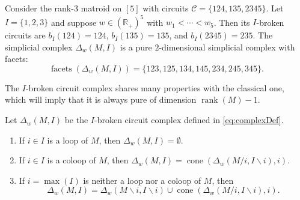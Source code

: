 \documentclass[ALCO,ThmDefs,Unicode,epreuves]{cedram}
\newcommand{\R}{\mathbb{R}}
\newcommand{\CC}{\mathcal{C}}
\DeclareMathOperator{\rank}{rank}
\DeclareMathOperator{\cone}{cone}
\DeclareMathOperator{\facets}{facets}
\begin{document}
\begin{exam} \label{ex:NonGenMatroid} 
Consider the rank-$3$ matroid on $[5]$ with circuits $\CC = \{124, 135, 2345\}$.
Let $I = \{1,2,3\}$ and suppose $w\in (\R_+)^5$ with $w_1<\cdots < w_5$.
Then its $I$-broken circuits are 
$b_I(124) = 124$, $b_I(135) = 135$, and
$b_I(2345) = 235$.
The simplicial complex $\Delta_w(M,I)$ is a pure $2$-dimensional simplicial complex with facets:
\[ \facets(\Delta_w(M,I))  =  \{ 123, 125, 134, 145, 234, 245, 345 \}.\]
\end{exam}


The $I$-broken circuit complex shares many properties with the classical one, which will imply that 
it is always pure of dimension $\rank (M)-1$. 


\begin{theo}\label{thm:Complex}
Let $\Delta_w(M,I)$ be the $I$-broken circuit complex defined in \eqref{eq:complexDef}. 
\begin{enumerate}[(\alph*)]
\item\label{theo3.2_a} %
If $i\in I$ is a loop of $M$, then $\Delta_w(M,I) = \emptyset$. 
\item\label{theo3.2_b} %
If $i\in I$ is a coloop of $M$, then $\Delta_w(M,I)=\cone (\Delta_w(M/i,I\backslash i),i)$.
\item\label{theo3.2_c} %
If $i=\max(I)$ is neither a loop nor a coloop of $M$, then 
\[\Delta_w(M,I) = \Delta_w(M\backslash i,I \backslash i)  \cup  \cone ( \Delta_w(M/i,I\backslash i), i). \]
\end{enumerate}
\end{theo}
\end{document}
